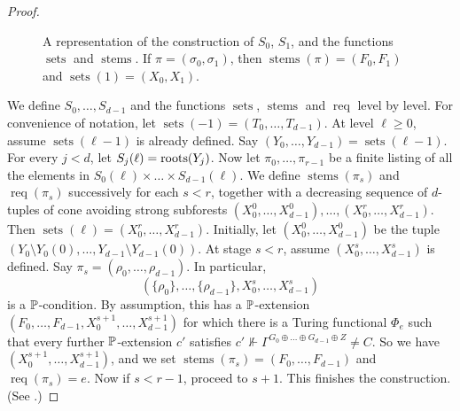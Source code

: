 \begin{proof}
\begin{figure}[h!]
\begin{center}
    \caption{A representation of the construction of $S_0$, $S_1$, and the functions $\operatorname{sets}$ and $\operatorname{stems}$. If $\pi=(\sigma_0,\sigma_1)$, then $\operatorname{stems}(\pi)=(F_0, F_1)$ and $\operatorname{sets}(1)=(X_0, X_1)$.}\label{fig:S3Constr}
    \label{fig:sca-HL}
\end{center}
\end{figure}

\construction We define $S_0, \dots, S_{d-1}$ and the functions $\operatorname{sets}$, $\operatorname{stems}$ and  $\operatorname{req}$ level by level. For convenience of notation, let $\operatorname{sets}(-1) = (T_0, \dots, T_{d-1})$.
At level $\ell \geq 0$, assume $\operatorname{sets}(\ell-1)$ is already defined.
Say $(Y_0, \dots, Y_{d-1}) = \operatorname{sets}(\ell-1)$.
For every $j < d$, let $S_j(\ell) = \operatorname{roots}(Y_j)$.
Now let $\pi_0, \dots, \pi_{r-1}$ be a finite listing of all the elements in  $S_0(\ell) \times \dots \times S_{d-1}(\ell)$. We define  $\operatorname{stems}(\pi_s)$ and $\operatorname{req}(\pi_s)$ successively for each $s < r$, together with a decreasing sequence of $d$-tuples of cone avoiding strong subforests $(X^0_0, \dots, X^0_{d-1}), \dots, (X^r_0, \dots, X^r_{d-1})$. Then $\operatorname{sets}(\ell) = (X^r_0, \dots, X^r_{d-1})$.
Initially, let $(X^0_0, \dots, X^0_{d-1})$ be the tuple $(Y_0 \setminus Y_0(0), \dots, Y_{d-1} \setminus Y_{d-1}(0))$.
At stage $s < r$, assume $(X^s_0, \dots, X^s_{d-1})$ is defined.
Say $\pi_s = (\rho_0, \dots, \rho_{d-1})$.
In particular,
$$
(\{\rho_0\}, \dots, \{\rho_{d-1}\}, X^s_0, \dots, X^s_{d-1})
$$
is a $\mathbb{P}$-condition. By assumption, this has a $\mathbb{P}$-extension $(F_0, \dots, F_{d-1}, X^{s+1}_0, \allowbreak \dots, X^{s+1}_{d-1})$ for which there is a Turing functional $\Phi_e$
such that every further $\mathbb{P}$-extension $c'$ satisfies $c' \not\Vdash \Gamma^{G_0 \oplus \dots \oplus G_{d-1} \oplus Z} \neq C$. So we have $(X^{s+1}_0, \allowbreak \dots, X^{s+1}_{d-1})$, and we set $\operatorname{stems}(\pi_s) = (F_0, \dots, F_{d-1})$ and $\operatorname{req}(\pi_s) = e$. Now if $s < r-1$, proceed to $s+1$.
This finishes the construction. (See .)


\end{proof}
